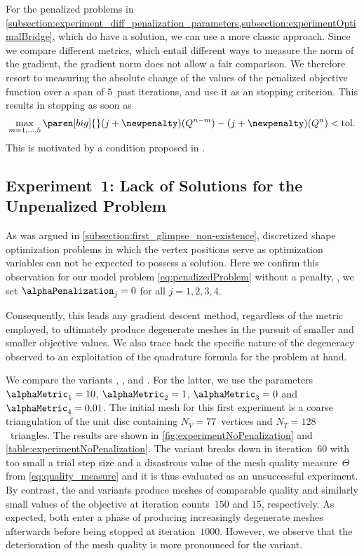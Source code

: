 For the penalized problems in \cref{subsection:experiment_diff_penalization_parameters,subsection:experimentOptimalBridge}, which do have a solution, we can use a more classic approach.
Since we compare different metrics, which entail different ways to measure the norm of the gradient, the gradient norm does not allow a fair comparison.
We therefore resort to measuring the absolute change of the values of the penalized objective function over a span of $5$~past iterations, and use it as an stopping criterion.
This results in stopping as soon as
\begin{equation}
	\label{eq:stoppingCriterionPenalized}
	\max_{m = 1,\ldots, 5} \paren[big]\{\}{(j+ \newpenalty)(Q^{n-m})-(j + \newpenalty)(Q^n)}
	<
	\textup{tol}
	.
\end{equation}
This is motivated by a condition proposed in \cite[Section~6.15, p.1324]{Laurain:2018:1}.


\subsection{Experiment~1: Lack of Solutions for the Unpenalized Problem}
\label{subsection:unpenalizedAndIdeal}

As was argued in \cref{subsection:first_glimpse_non-existence}, discretized shape optimization problems in which the vertex positions serve as optimization variables can not be expected to possess a solution.
Here we confirm this observation for our model problem \eqref{eq:penalizedProblem} without a penalty, \ie, we set $\alphaPenalization_j = 0$ for all $j=1,2,3,4$.

Consequently, this leads any gradient descent method, regardless of the metric employed, to ultimately produce degenerate meshes in the pursuit of smaller and smaller objective values.
We also trace back the specific nature of the degeneracy observed to an exploitation of the quadrature formula for the problem at hand.

We compare the variants \EucEuc, \ElasEuc, and \CompComp.
For the latter, we use the parameters $\alphaMetric_1 = 10$, $\alphaMetric_2 = 1 $, $\alphaMetric_3 = 0$ and $\alphaMetric_4 = 0.01$.
The initial mesh for this first experiment is a coarse triangulation of the unit disc containing $N_V = 77$~vertices and $N_T = 128$~triangles.
The results are shown in \cref{fig:experimentNoPenalization} and \cref{table:experimentNoPenalization}.
The \EucEuc variant breaks down in iteration~$60$ with too small a trial step size and a disastrous value of the mesh quality measure~$\Theta$ from \eqref{eq:quality_measure} and it is thus evaluated as an unsuccessful experiment.
By contrast, the \ElasEuc and \CompComp variants produce meshes of comparable quality and similarly small values of the objective at iteration counts~$150$ and $15$, respectively.
As expected, both enter a phase of producing increasingly degenerate meshes afterwards before being stopped at iteration~$1000$.
However, we observe that the deterioration of the mesh quality is more pronounced for the \ElasEuc variant.

